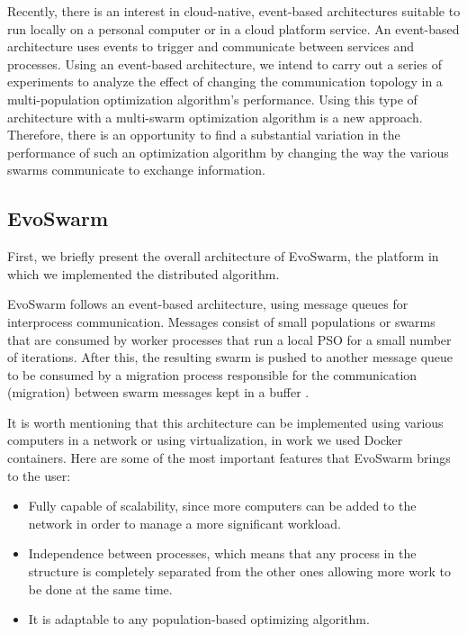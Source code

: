 \documentclass[runningheads]{llncs}
\begin{document}
Recently, there is an interest in cloud-native, event-based architectures
suitable to run locally on a personal computer or in a cloud platform service.
An event-based architecture uses events to trigger and communicate between
services and processes. Using an event-based architecture, we intend to carry
out a series of experiments to analyze the effect of changing the communication
topology in a multi-population optimization algorithm's performance. Using this
type of architecture with a multi-swarm optimization algorithm is a new
approach. Therefore, there is an opportunity to find a substantial variation in
the performance of such an optimization algorithm by changing the way the
various swarms communicate to exchange information.

\subsection{EvoSwarm} 
First, we briefly present the overall architecture of EvoSwarm, the 
platform in which we implemented the distributed algorithm. 

EvoSwarm follows an event-based architecture, using message queues for
interprocess communication. Messages consist of small populations or swarms that
are consumed by worker processes that run a local PSO for a small number of
iterations. After this, the resulting swarm is pushed to another message queue
to be consumed by a migration process responsible for the communication
(migration) between swarm messages kept in a buffer \cite{b18}.



It is worth mentioning that this architecture can be implemented using various
computers in a network or using virtualization, in work we used Docker containers. 
Here are some of the most important features that
EvoSwarm brings to the user:

\begin{itemize} 
  
  \item Fully capable of scalability, since more computers can be added to the
  network in order to manage a more significant workload.
    
    \item Independence between processes, which means that any process in the
    structure is completely separated from the other ones allowing more work to
    be done at the same time.
    
    \item It is adaptable to any population-based optimizing algorithm.
\end{itemize}
\end{document}

